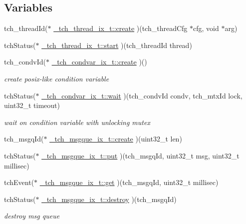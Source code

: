 \subsection*{Variables}
\begin{DoxyCompactItemize}
\item 
tch\+\_\+thread\+Id($\ast$ \hyperlink{group___a_p_i_ga3ac33307df56ca2683c30a7055984a17}{\+\_\+tch\+\_\+thread\+\_\+ix\+\_\+t\+::create} )(tch\+\_\+thread\+Cfg $\ast$cfg, void $\ast$arg)
\item 
tch\+Status($\ast$ \hyperlink{group___a_p_i_ga5daef7eb8faaa43d6a3c136aa0af356d}{\+\_\+tch\+\_\+thread\+\_\+ix\+\_\+t\+::start} )(tch\+\_\+thread\+Id thread)
\item 
tch\+\_\+condv\+Id($\ast$ \hyperlink{group___a_p_i_ga4baf0cb2e2052176f805437c9d226b56}{\+\_\+tch\+\_\+condvar\+\_\+ix\+\_\+t\+::create} )()
\begin{DoxyCompactList}\small\item\em create posix-\/like condition variable \end{DoxyCompactList}\item 
tch\+Status($\ast$ \hyperlink{group___a_p_i_ga4a12ede67ac36e7ce4e521144dd0c773}{\+\_\+tch\+\_\+condvar\+\_\+ix\+\_\+t\+::wait} )(tch\+\_\+condv\+Id condv, tch\+\_\+mtx\+Id lock, uint32\+\_\+t timeout)
\begin{DoxyCompactList}\small\item\em wait on condition variable with unlocking mutex \end{DoxyCompactList}\item 
tch\+\_\+msgq\+Id($\ast$ \hyperlink{group___a_p_i_gacd7fbe11975c8e0b1a93fe399aed2ee0}{\+\_\+tch\+\_\+msgque\+\_\+ix\+\_\+t\+::create} )(uint32\+\_\+t len)
\item 
tch\+Status($\ast$ \hyperlink{group___a_p_i_ga995b80b91503a51429073f1c7b18baba}{\+\_\+tch\+\_\+msgque\+\_\+ix\+\_\+t\+::put} )(tch\+\_\+msgq\+Id, uint32\+\_\+t msg, uint32\+\_\+t millisec)
\item 
tch\+Event($\ast$ \hyperlink{group___a_p_i_gae5f29b1432e00abd819c419e351f6f0b}{\+\_\+tch\+\_\+msgque\+\_\+ix\+\_\+t\+::get} )(tch\+\_\+msgq\+Id, uint32\+\_\+t millisec)
\item 
\hypertarget{group___a_p_i_gad72012110f051f2e783b3f7fd01178ad}{tch\+Status($\ast$ \hyperlink{group___a_p_i_gad72012110f051f2e783b3f7fd01178ad}{\+\_\+tch\+\_\+msgque\+\_\+ix\+\_\+t\+::destroy} )(tch\+\_\+msgq\+Id)}\label{group___a_p_i_gad72012110f051f2e783b3f7fd01178ad}

\begin{DoxyCompactList}\small\item\em destroy msg queue \end{DoxyCompactList}\end{DoxyCompactItemize}


